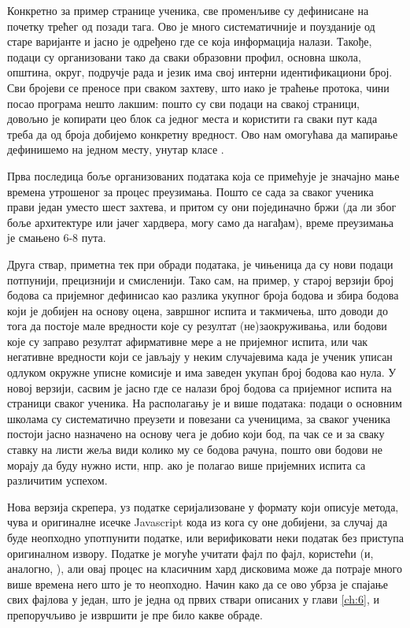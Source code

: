 Конкретно за пример странице ученика, све променљиве су дефинисане на почетку трећег од позади  тага. Ово је много систематичније и поузданије од старе варијанте и јасно је одређено где се која информација налази. Такође, подаци су организовани тако да сваки образовни профил, основна школа, општина, округ, подручје рада и језик има свој интерни идентификациони број. Сви бројеви се преносе при сваком захтеву, што иако је траћење протока, чини посао програма нешто лакшим: пошто су сви подаци на свакој страници, довољно је копирати цео блок са једног места и користити га сваки пут када треба да од броја добијемо конкретну вредност. Ово нам омогућава да мапирање дефинишемо на једном месту, унутар класе .

Прва последица боље организованих података која се примећује је значајно мање времена утрошеног за процес преузимања. Пошто се сада за сваког ученика прави један уместо шест захтева, и притом су они појединачно бржи (да ли због боље архитектуре или јачег хардвера, могу само да нагађам), време преузимања је смањено 6-8 пута. 

Друга ствар, приметна тек при обради података, је чињеница да су нови подаци потпунији, прецизнији и смисленији. Тако сам, на пример, у старој верзији број бодова са пријемног дефинисао као разлика укупног броја бодова и збира бодова који је добијен на основу оцена, завршног испита и такмичења, што доводи до тога да постоје мале вредности које су резултат (не)заокруживања, или бодови које су заправо резултат афирмативне мере а не пријемног испита, или чак негативне вредности који се јављају у неким случајевима када је ученик уписан одлуком окружне уписне комисије и има заведен укупан број бодова као нула. У новој верзији, сасвим је јасно где се налази број бодова са пријемног испита на страници сваког ученика. На располагању је и више података: подаци о основним школама су систематично преузети и повезани са ученицима, за сваког ученика постоји јасно назначено на основу чега је добио који бод, па чак се и за сваку ставку на листи жеља види колико му се бодова рачуна, пошто ови бодови не морају да буду нужно исти, нпр. ако је полагао више пријемних испита са различитим успехом.

\vspace{5mm} %

Нова верзија скрепера, уз податке серијализоване у формату који описује  метода, чува и оригиналне исечке Javascript кода из кога су оне добијени, за случај да буде неопходно употпунити податке, или верификовати неки податак без приступа оригиналном извору. Податке је могуће учитати фајл по фајл, користећи  (и, аналогно, ), али овај процес на класичним хард дисковима може да потраје много више времена него што је то неопходно. Начин како да се ово убрза је спајање свих фајлова у један, што је једна од првих ствари описаних у глави \ref{ch:6}, и препоручљиво је извршити је пре било какве обраде.



